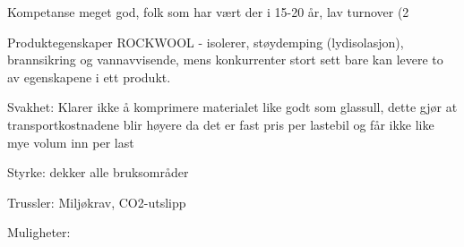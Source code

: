 Kompetanse meget god, folk som har vært der i 15-20 år, lav turnover (2%

Produktegenskaper ROCKWOOL - isolerer, støydemping (lydisolasjon), brannsikring og vannavvisende, mens konkurrenter stort sett bare kan levere to av egenskapene i ett produkt. 

Svakhet: Klarer ikke å komprimere materialet like godt som glassull, dette gjør at transportkostnadene blir høyere da det er fast pris per lastebil og får ikke like mye volum inn per last 

Styrke: dekker alle bruksområder

Trussler: Miljøkrav, CO2-utslipp

Muligheter: 


